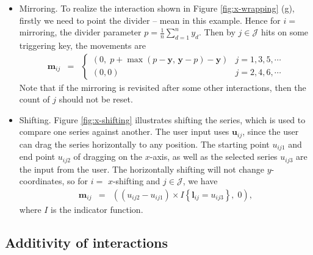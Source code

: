 \documentclass[12pt]{article}
\begin{document}
\begin{itemize}
\item Mirroring. To realize the interaction shown in Figure \ref{fig:x-wrapping} (g),
firstly we need to point the divider -- mean in this example.
Hence for $i=$ mirroring, the divider parameter
$p = \frac{1}{n}\sum_{d=1}^{n}y_d$. Then by $j\in\mathcal{J}$
hits on some triggering key, the movements are
\begin{eqnarray*}
\mathbf{m}{}_{ij} & = & \begin{cases}
(0, \; p+\max(p-\mathbf{y},\,\mathbf{y}-p)-\mathbf{y}) & j=1,3,5,\cdots \\
(0,0) & j=2,4,6,\cdots
\end{cases}
\end{eqnarray*}
Note that if the mirroring is revisited after some other interactions,
then the count of $j$ should not be reset.


\item Shifting. Figure \ref{fig:x-shifting} illustrates
shifting the series, which is used to compare one series
against another. The user input uses $\mathbf{u}{}_{ij}$,
since the user can drag the
series horizontally to any position. The starting point
$u_{ij1}$ and end point $u_{ij2}$ of dragging on the $x$-axis,
as well as the selected series $u_{ij3}$ are the input from the user.
The horizontally shifting will not change $y$-coordinates, so for
$i=$ $x$-shifting and $j\in\mathcal{J}$, we have
\begin{eqnarray*}
\mathbf{m}{}_{ij} & = &
((u_{ij2}-u_{ij1})\times I\left\{ \mathbf{l}{}_{ij}=u_{ij3}\right\}, \; 0),
\end{eqnarray*}
where $I$ is the indicator function.

\end{itemize}


\subsection{Additivity of interactions\label{interaction-addition}}
\end{document}
